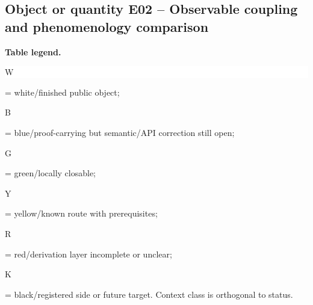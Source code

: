 \subsection*{Object or quantity E02 -- Observable coupling and phenomenology comparison}
\hypertarget{objproof:E02}{}
\par\smallskip\noindent\begin{minipage}{0.99\linewidth}\footnotesize\raggedright\textbf{Table legend.} \colorbox{white}{\strut W} = white/finished public object; \colorbox{cyan!20}{\strut B} = blue/proof-carrying but semantic/API correction still open; \colorbox{green!18}{\strut G} = green/locally closable; \colorbox{yellow!25}{\strut Y} = yellow/known route with prerequisites; \colorbox{red!20}{\strut R} = red/derivation layer incomplete or unclear; \colorbox{black!18}{\strut K} = black/registered side or future target. Context class is orthogonal to status.\end{minipage}\par\vspace{0.25em}
